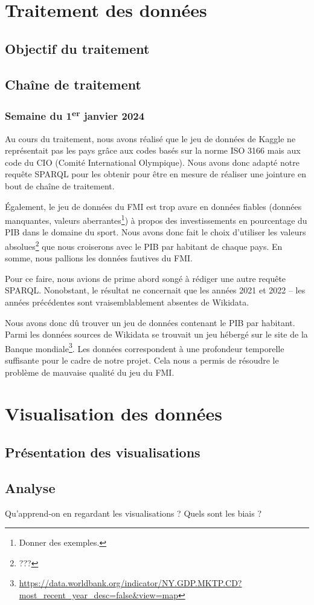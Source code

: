 \documentclass[hidelinks, 12pt]{article}
\begin{document}
	\section{Traitement des données}
	
		\subsection{Objectif du traitement}
		
		\subsection{Chaîne de traitement}
		
			\subsubsection{Semaine du 1\textsuperscript{er} janvier 2024}
		
			Au cours du traitement, nous avons réalisé que le jeu de données de Kaggle ne représentait pas les pays grâce aux codes basés sur la norme ISO 3166 mais aux code du CIO (Comité International Olympique). Nous avons donc adapté notre requête SPARQL pour les obtenir pour être en mesure de réaliser une jointure en bout de chaîne de traitement.
		
			Également, le jeu de données du FMI est trop avare en données fiables (données manquantes, valeurs aberrantes\footnote{Donner des exemples.}) à propos des investissements en pourcentage du PIB dans le domaine du sport. Nous avons donc fait le choix d'utiliser les valeurs absolues\footnote{???} que nous croiserons avec le PIB par habitant de chaque pays. En somme, nous pallions les données fautives du FMI.
		
			Pour ce faire, nous avions de prime abord songé à rédiger une autre requête SPARQL. Nonobstant, le résultat ne concernait que les années 2021 et 2022 -- les années précédentes sont vraisemblablement absentes de Wikidata.
		
			Nous avons donc dû trouver un jeu de données contenant le PIB par habitant. Parmi les données sources de Wikidata se trouvait un jeu hébergé sur le site de la Banque mondiale\footnote{\url{https://data.worldbank.org/indicator/NY.GDP.MKTP.CD?most_recent_year_desc=false&view=map}}. Les données correspondent à une profondeur temporelle suffisante pour le cadre de notre projet. Cela nous a permis de résoudre le problème de mauvaise qualité du jeu du FMI.
		

	\section{Visualisation des données}
	
		\subsection{Présentation des visualisations}
		
		\subsection{Analyse}
		
		Qu'apprend-on en regardant les visualisations ? Quels sont les biais ?
		\newpage

	\tableofcontents
\end{document}
